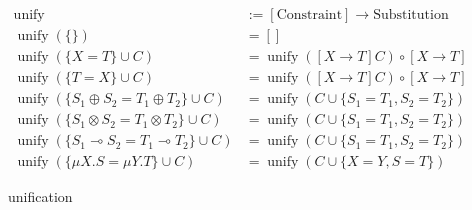 \documentclass[a4j, dvipdfmx]{jsarticle}
\theoremstyle{definition}
\newcommand{\unify}{\mathop{\mathrm{unify}}\nolimits}
\begin{document}
\begin{figure}[H]
  \begin{align*}
    \unify                                                   &:= [\text{Constraint}] \rightarrow \text{Substitution} \\
    \unify(\{\})                                             &= [] \\
    \unify(\{X = T\} \cup C)                                 &= \unify([X \rightarrow T]C) \circ [X \rightarrow T] \\
    \unify(\{T = X\} \cup C)                                 &= \unify([X \rightarrow T]C) \circ [X \rightarrow T] \\
    \unify(\{S_1 \oplus S_2 = T_1 \oplus T_2\} \cup C)       &= \unify(C \cup \{S_1 = T_1, S_2 = T_2\}) \\
    \unify(\{S_1 \otimes S_2 = T_1 \otimes T_2\} \cup C)     &= \unify(C \cup \{S_1 = T_1, S_2 = T_2\}) \\
    \unify(\{S_1 \multimap S_2 = T_1 \multimap T_2\} \cup C) &= \unify(C \cup \{S_1 = T_1, S_2 = T_2\}) \\
    \unify(\{\mu{X}.S = \mu{Y}.T\} \cup C)                   &= \unify(C \cup \{X = Y, S = T\})
  \end{align*}
  \caption{unification}
  \label{fig:unification}
\end{figure}
\end{document}
